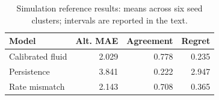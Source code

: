 \begin{table}[t]
\caption{Simulation reference results: means across six seed clusters; intervals are reported in the text.}
\label{tab:sumo-results}
\centering
\begin{tabular}{lrrr}
\toprule
Model & Alt. MAE & Agreement & Regret \\
\midrule
Calibrated fluid & 2.029 & 0.778 & 0.235 \\
Persistence & 3.841 & 0.222 & 2.947 \\
Rate mismatch & 2.143 & 0.708 & 0.365 \\
\bottomrule
\end{tabular}
\end{table}

